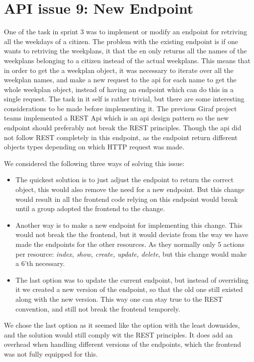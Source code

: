 \section{API issue 9: New Endpoint} \label{sec:webIssue9}

One of the task in sprint 3 was to implement or modify an endpoint for retriving all the weekdays of a citizen. The problem with the existing endpoint is if one wants to retriving the weekplans, it that the en only returns all the names of the weekplans belonging to a citizen instead of the actual weekplans. This means that in order to get the a weekplan object, it was necessary to iterate over all the weekplan names, and make a new request to the api for each name to get the whole weekplan object, instead of having an endpoint which can do this in a single request. 
The task in it self is rather trivial, but there are some interesting considerations to be made before implementing it. The previous Giraf project teams implemented a REST Api which is an \gls{api} design pattern so the new endpoint should preferably not break the REST principles. Though the \gls{api} did not follow REST completely in this endpoint, as the endpoint return different objects types depending on which HTTP request was made. 

We considered the following three ways of solving this issue:
\begin{itemize}
\item The quickest solution is to just adjust the endpoint to return the correct object, this would also remove the need for a new endpoint. But this change would result in all the frontend code relying on this endpoint would break until a group adopted the frontend to the change.
\item Another way is to make a new endpoint for implementing this change. This would not break the the frontend, but it would deviate from the way we have made the endpoints for the other resources. As they normally only 5 actions per resource: \textit{index, show, create, update, delete}, but this change would make a 6'th necessary.
\item The last option was to update the current endpoint, but instead of overriding it we created a new version of the endpoint, so that the old one still existed along with the new version. This way one can stay true to the REST convention, and still not break the frontend temporely.
\end{itemize}

We chose the last option as it seemed like the option with the least downsides, and the solution would still comply wit the REST principles. It does add an overhead when handling different versions of the endpoints, which the frontend was not fully equipped for this.
